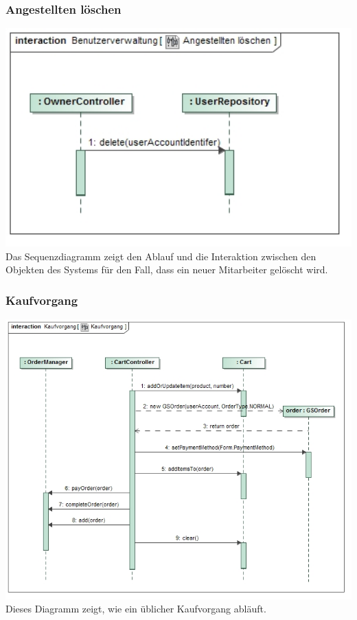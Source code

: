 \documentclass[pdftex,12pt,a4paper]{article}
\begin{document}
\subsubsection*{Angestellten l\"oschen}
\includegraphics[width=1\textwidth]{../../Entwurf/angestellten_loeschen_ood}
Das Sequenzdiagramm zeigt den Ablauf und die Interaktion zwischen den Objekten des Systems f\"ur den Fall, dass ein neuer Mitarbeiter gel\"oscht wird.
\subsubsection*{Kaufvorgang}
\includegraphics[width=1\textwidth]{../../Entwurf/kaufvorgang_ood}
Dieses Diagramm zeigt, wie ein \"ublicher Kaufvorgang abl\"auft.
\end{document}
